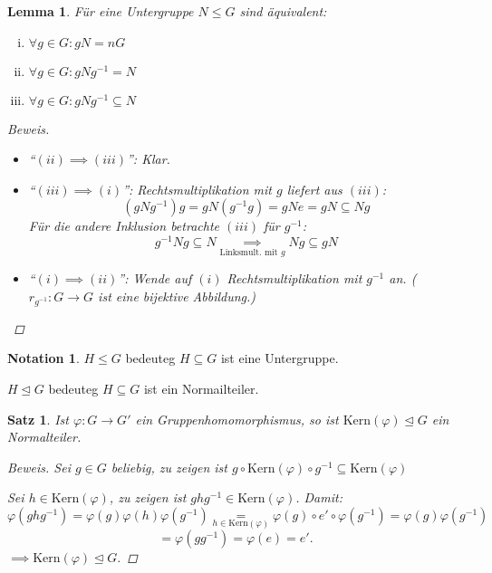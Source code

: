 \documentclass[a4paper]{article}
\theoremstyle{plain}
\newtheorem{lemm}[thm]{Lemma}
\newtheorem{satz}[thm]{Satz}
\theoremstyle{definition}
\newtheorem*{nota*}{Notation}
\begin{document}
\begin{lemm}
  Für eine Untergruppe $N \le G$ sind äquivalent:
  \begin{enumerate}[(i)]
    \item $\forall g \in G : gN = nG$
    \item $\forall g \in G : gNg^{-1} = N$
    \item $\forall g \in G : gNg^{-1} \subseteq N$
  \end{enumerate}
  \begin{proof}[Beweis]
\begin{itemize}
\item ``$(ii)\implies (iii)$'': Klar.
  \item ``$(iii)\implies (i)$'': Rechtsmultiplikation mit $g$ liefert aus $(iii)$:
        $$(gNg^{-1})g = gN(g^{-1}g) = gNe = gN \subseteq Ng$$
        Für die andere Inklusion betrachte $(iii)$ für $g^{-1}$:
        $$g^{-1}Ng \subseteq N \underset{\text{Linksmult. mit }g}\implies Ng \subseteq gN$$
\item ``$(i)\implies (ii)$'': Wende auf $(i)$ Rechtsmultiplikation mit $g^{-1}$ an. ($r_{g^{-1}}: G \to G$ ist eine bijektive Abbildung.)
\end{itemize}
  \end{proof}
\end{lemm}

\begin{nota*}
  \item $H \le G$ bedeuteg $H \subseteq G$ ist eine Untergruppe.
  \item $H \trianglelefteq G$ bedeuteg $H \subseteq G$ ist ein Normailteiler.
\end{nota*}

\begin{satz}
  Ist $\varphi : G \to G'$ ein Gruppenhomomorphismus, so ist $\mathrm{Kern}(\varphi) \trianglelefteq G$ ein Normalteiler.
  \begin{proof}[Beweis]
    Sei $g \in G$ beliebig, zu zeigen ist $g \circ \mathrm{Kern}(\varphi) \circ g^{-1} \subseteq \mathrm{Kern}(\varphi)$
    \item Sei $h \in \mathrm{Kern}(\varphi)$, zu zeigen ist $ghg^{-1} \in \mathrm{Kern}(\varphi)$.
    Damit:
    $$\varphi(ghg^{-1}) = \varphi(g)\varphi(h)\varphi(g^{-1}) \underset{h \in \mathrm{Kern}(\varphi)} = \varphi(g) \circ e' \circ \varphi(g^{-1}) = \varphi(g)\varphi(g^{-1})$$
    $$= \varphi(gg^{-1}) = \varphi(e) = e'.$$
    $\implies \mathrm{Kern}(\varphi) \trianglelefteq G.$
  \end{proof}
\end{satz}
\end{document}
